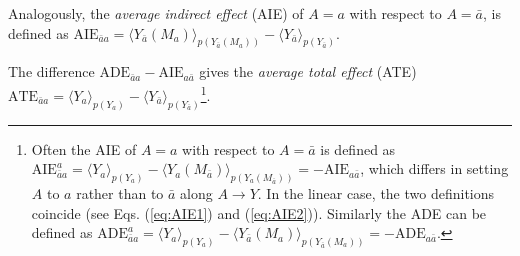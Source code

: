 \documentclass[runningheads]{llncs}
\newcommand{\av}[1]{\langle #1 \rangle}
\begin{document}
Analogously, the \emph{average indirect effect} (AIE) of $A=a$ with respect to $A=\bar a$, 
is defined as $\textrm{AIE}_{\bar a a } =\av{Y_{\bar a}(M_a)}_{p(Y_{\bar a}(M_a))} - \av{Y_{\bar a}}_{p(Y_{\bar a})}$.

The difference $\textrm{ADE}_{\bar a a } - \textrm{AIE}_{a \bar a }$ gives the \emph{average total effect} (ATE) $\textrm{ATE}_{\bar a a} = \av{Y_{a}}_{p(Y_{a})} - \av{Y_{\bar a}}_{p(Y_{\bar a})}$\footnote{Often the AIE of $A=a$ with respect to $A=\bar a$ is defined as $\textrm{AIE}^a_{\bar a a} = \av{Y_{a}}_{p(Y_{a})} - \av{Y_{a}(M_{\bar a})}_{p(Y_{a}(M_{\bar a}))}= -\textrm{AIE}_{a \bar a }$, which differs in setting $A$ to $a$ rather than to $\bar a$ along $A\rightarrow Y$. In the linear case, the two 
definitions coincide (see Eqs. (\ref{eq:AIE1}) and (\ref{eq:AIE2})).
Similarly the ADE can be defined as $\textrm{ADE}^a_{\bar a a} = \av{Y_{a}}_{p(Y_{a})} - \av{Y_{\bar a}(M_a)}_{p(Y_{\bar a}(M_a))}= -\textrm{ADE}_{a \bar a }$.}. 
\end{document}
